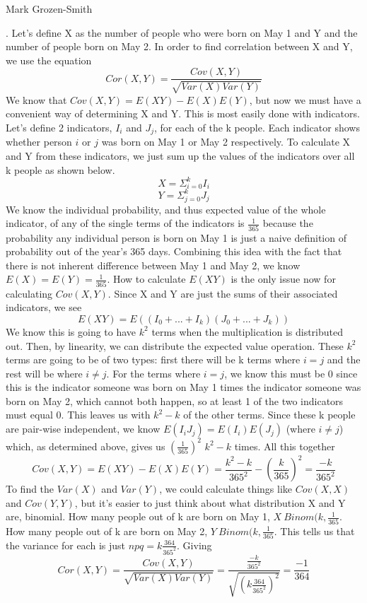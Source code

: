 \documentclass[11pt]{article}
\begin{document}
 \hfill Mark Grozen-Smith

\bigskip

. Let's define X as the number of people who were born on May 1 and Y and the number of people born on May 2. In order to find correlation between X and Y, we use the equation
	$$Cor(X,Y) = \frac{Cov(X,Y)}{\sqrt{Var(X)Var(Y)}}$$
	We know that $Cov(X,Y) = E(XY) - E(X)E(Y)$, but now we must have a convenient way of determining X and Y.  This is most easily done with indicators.  Let's define 2 indicators, $I_i$ and $J_j$, for each of the k people. Each indicator shows whether person $i$ or $j$ was born on May 1 or May 2 respectively. To calculate X and Y from these indicators, we just sum up the values of the indicators over all k people as shown below. 
	$$ X = \Sigma^k_{i=0} I_i$$
	$$ Y = \Sigma^k_{j=0} J_j$$
	We know the individual probability, and thus expected value of the whole indicator, of any of the single terms of the indicators  is $\frac{1}{365}$ because the probability any individual person is born on May 1 is just a naive definition of probability out of the year's 365 days. Combining this idea with the fact that there is not inherent difference between May 1 and May 2, we know $E(X) = E(Y) = \frac{1}{365}$.  How to calculate $E(XY)$ is the only issue now for calculating $Cov(X,Y)$.  Since X and Y are just the sums of their associated indicators, we see
	$$ E(XY) = E((I_0 + ... + I_k)(J_0 + ... + J_k))$$ 
	We know this is going to have $k^2$ terms when the multiplication is distributed out.  Then, by linearity, we can distribute the expected value operation.  These $k^2$ terms are going to be of two types: first there will be k terms where $i=j$ and the rest will be where $i\neq j$.  For the terms where $i=j$, we know this must be 0 since this is the indicator someone was born on May 1 times the indicator someone was born on May 2, which cannot both happen, so at least 1 of the two indicators must equal 0. This leaves us with $k^2 - k$ of the other terms.  Since these k people are pair-wise independent, we know $E(I_iJ_j) = E(I_i)E(J_j)$ (where $i\neq j$) which, as determined above, gives us $(\frac{1}{365})^2$ $k^2-k$ times.  All this together
	$$ Cov(X,Y) = E(XY) - E(X)E(Y) = \frac{k^2 - k}{365^2} - (\frac{k}{365})^2 = \frac{-k}{365^2}$$
	To find the $Var(X)$ and $Var(Y)$, we could calculate things like $Cov(X,X)$ and $Cov(Y,Y)$, but it's easier to just think about what distribution X and Y are, binomial.  How many people out of k are born on May 1, $X~Binom(k,\frac{1}{365}$. How many people out of k are born on May 2, $Y~Binom(k,\frac{1}{365}$.  This tells us that the variance for each is just $npq = k \frac{364}{365^2}$. 
	Giving
	$$ Cor(X,Y) = \frac{Cov(X,Y)}{\sqrt{Var(X)Var(Y)}} = \frac{\frac{-k}{365^2}}{\sqrt{(k\frac{364}{365^2})^2}} = \boxed{ \frac{-1}{364} }$$
\end{document}
